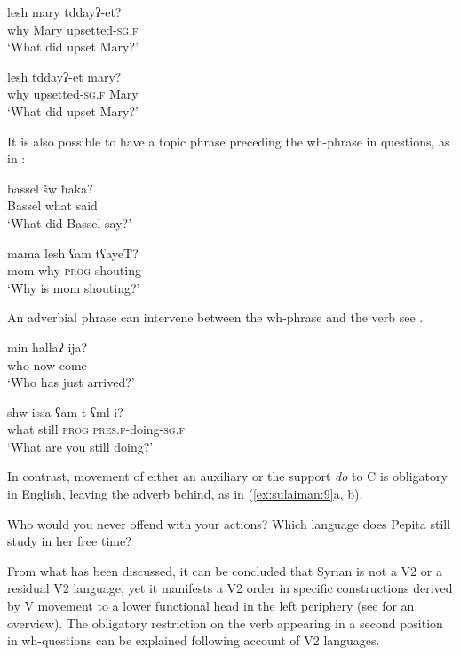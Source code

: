 \documentclass[output=paper]{LSP/langsci}
\begin{document}
\ea%
\label{ex:sulaiman:6}
\ea \label{ex:sulaiman:6a}
\gll lesh     mary     tddayʔ-et?              \\
why Mary upsetted-\textsc{sg.f}          \\
\glt  ‘What did upset Mary?’

\ex \label{ex:sulaiman:6b}
\gll lesh        tddayʔ-et                                         mary?                            \\
 why      upsetted-\textsc{sg.f}    Mary                 \\
\glt ‘What did upset Mary?’
\z
\z

It is also possible to have a topic phrase preceding the wh-phrase in questions, as in :


\ea%
\label{ex:sulaiman:7}
\ea
\gll bassel        šw                      ħaka?\\
 Bassel      what      said\\
\glt ‘What did Bassel say?’

\ex
\gll mama      lesh        ʕam                tʕayeT?\\
 mom              why        \textsc{prog}     shouting\\
\glt  ‘Why is mom shouting?’
\z
\z

An adverbial phrase can intervene between the wh-phrase and the verb see .



\ea%
\label{ex:sulaiman:8}
\ea
\gll min          hallaʔ            ija?\\
 who        now                 come\\
\glt ‘Who has just arrived?’

\ex
\gll shw              issa      ʕam                  t-ʕml-i?\\
 what        still    \textsc{prog}        \textsc{pres.f}-doing-\textsc{sg.f}\\
\glt  ‘What are you still doing?’
\z
\z

In contrast, movement of either an auxiliary or the support \textit{do} to C is obligatory in English, leaving the adverb behind, as in (\ref{ex:sulaiman:9}a, b).


\ea%
\label{ex:sulaiman:9}
\ea Who would you never offend with your actions?
\ex Which language does Pepita still study in her free time?
\z
\z

From what has been discussed, it can be concluded that Syrian  is not a V2 or a residual V2 language, yet it manifests a V2 order in specific constructions derived by V movement to a lower functional head in the left periphery (see \citealt{Benmamoun2000,AounEtAl2010,Sulaiman2016} for an overview). The obligatory restriction on the verb appearing in a second position in wh-questions can be explained following  account of V2 languages.
\end{document}
